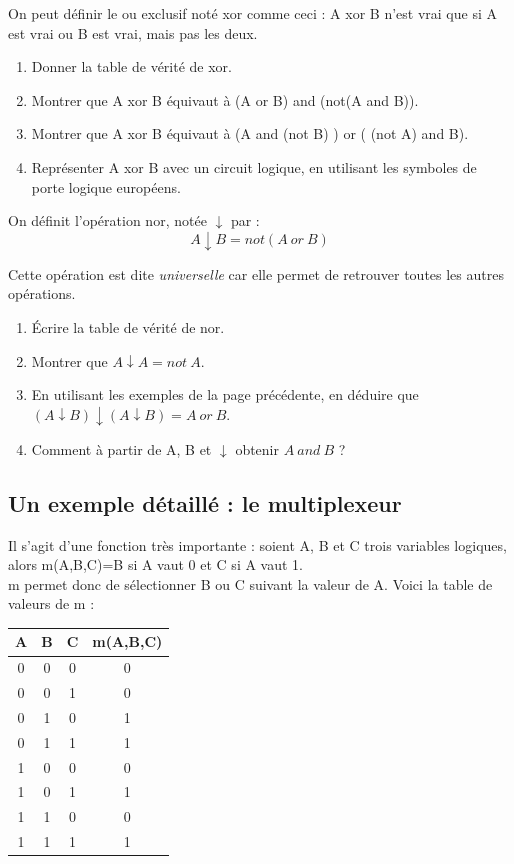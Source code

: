 \documentclass[a5paper,12pt,french]{book}
\begin{document}
\begin{exercice}[]
	On peut définir le \og ou exclusif\fg{} noté xor comme ceci :  A xor B n'est vrai que si A est vrai ou B est vrai, mais pas les deux.
	\begin{enumerate}[\bfseries 1.]
		\item 	Donner la table de vérité de xor.
		\item 	Montrer que A xor B équivaut à (A or B) and (not(A and B)).
		\item 	Montrer que A xor B équivaut à (A and (not B) ) or ( (not A) and B).
		\item 	Représenter A xor B avec un circuit logique, en utilisant les symboles de porte logique européens.
	\end{enumerate}
\end{exercice}
\newpage
\begin{exercice}[]
	On définit l'opération \og nor\fg{}, notée $\downarrow$ par : $$A\downarrow B = not(A\ or\ B)$$
	
	Cette opération est dite \textit{universelle} car elle permet de retrouver toutes les autres opérations.
	
	\begin{enumerate}[\bfseries 1.]
		\item 	\'Ecrire la table de vérité de nor.
		\item 	Montrer que $A\downarrow A = not\ A$.
		\item 	En utilisant les exemples de la page précédente, en déduire que $(A\downarrow B)\downarrow(A\downarrow B) = A\ or\ B$.
		\item 	Comment à partir de A, B et $\downarrow$ obtenir $A\ and\ B$ ?
	\end{enumerate}
\end{exercice}
\newpage
\subsection{Un exemple détaillé : le multiplexeur}

Il s'agit d'une fonction très importante : soient A, B et C trois variables logiques, alors m(A,B,C)=B si A vaut 0 et C si A vaut 1.\\ m permet 
donc de sélectionner B ou C suivant la valeur de A. Voici la table de valeurs de m :
\begin{center}
	\begin{tabular}{|c|c|c|c|}
		\hline
		A & B & C & m(A,B,C) \\
		\hline
		0 & 0 & 0 & 0        \\
		\hline
		0 & 0 & 1 & 0        \\
		\hline
		0 & 1 & 0 & 1        \\
		\hline
		0 & 1 & 1 & 1        \\
		\hline
		1 & 0 & 0 & 0        \\
		\hline
		1 & 0 & 1 & 1        \\
		\hline
		1 & 1 & 0 & 0        \\
		\hline
		1 & 1 & 1 & 1        \\
		\hline
	\end{tabular}
\end{center}
\end{document}
